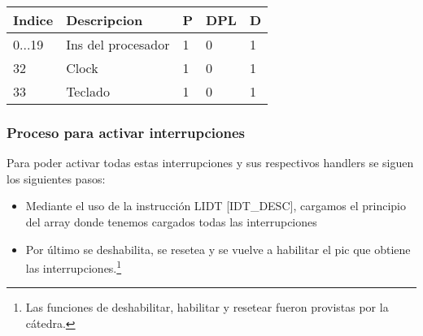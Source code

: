 \begin{tabular}{l l l l l}
Indice & Descripcion & P & DPL & D\\

\hline
0...19 & Ins del procesador & 1 & 0 & 1 \\
32 & Clock & 1 & 0 & 1\\
33 & Teclado	 & 1 & 0 & 1\\
\end{tabular}

\subsubsection{Proceso para activar interrupciones}

Para poder activar todas estas interrupciones y sus respectivos handlers se siguen los siguientes pasos:\\
\begin{itemize}
 \item Mediante el uso de la instrucci\'on LIDT [IDT\_DESC], cargamos el principio del array donde tenemos cargados todas las interrupciones
 \item Por \'ultimo se deshabilita, se resetea y se vuelve a habilitar el pic que obtiene las interrupciones.\footnote{Las funciones de 
deshabilitar, habilitar y resetear fueron provistas por la c\'atedra.}
\end{itemize}

